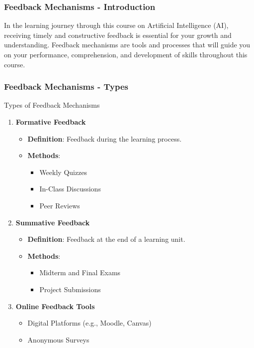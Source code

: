 \documentclass[aspectratio=169]{beamer}
\begin{document}
\begin{frame}[fragile]
    \frametitle{Feedback Mechanisms - Introduction}
    In the learning journey through this course on Artificial Intelligence (AI), receiving timely and constructive feedback is essential for your growth and understanding. Feedback mechanisms are tools and processes that will guide you on your performance, comprehension, and development of skills throughout this course.
\end{frame}

\begin{frame}[fragile]
    \frametitle{Feedback Mechanisms - Types}
    \begin{block}{Types of Feedback Mechanisms}
        \begin{enumerate}
            \item \textbf{Formative Feedback}
                \begin{itemize}
                    \item \textbf{Definition}: Feedback during the learning process.
                    \item \textbf{Methods}:
                        \begin{itemize}
                            \item Weekly Quizzes
                            \item In-Class Discussions
                            \item Peer Reviews
                        \end{itemize}
                \end{itemize}

            \item \textbf{Summative Feedback}
                \begin{itemize}
                    \item \textbf{Definition}: Feedback at the end of a learning unit.
                    \item \textbf{Methods}:
                        \begin{itemize}
                            \item Midterm and Final Exams
                            \item Project Submissions
                        \end{itemize}
                \end{itemize}

            \item \textbf{Online Feedback Tools}
                \begin{itemize}
                    \item Digital Platforms (e.g., Moodle, Canvas)
                    \item Anonymous Surveys
                \end{itemize}
        \end{enumerate}
    \end{block}
\end{frame}
\end{document}
